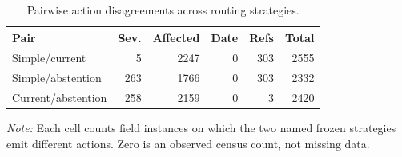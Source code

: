 \begin{table}[t]
\centering
\caption{Pairwise action disagreements across routing strategies.}
\label{tab:rq2-disagreements}
\footnotesize
\setlength{\tabcolsep}{3pt}
\begin{tabular}{lrrrrr}
\toprule
Pair & Sev. & Affected & Date & Refs & Total \\
\midrule
Simple/current & 5 & 2247 & 0 & 303 & 2555 \\
Simple/abstention & 263 & 1766 & 0 & 303 & 2332 \\
Current/abstention & 258 & 2159 & 0 & 3 & 2420 \\
\bottomrule
\end{tabular}
\begin{minipage}{0.98\linewidth}
\footnotesize\textit{Note:} Each cell counts field instances on which the two named frozen strategies emit different actions. Zero is an observed census count, not missing data.
\end{minipage}
\end{table}
